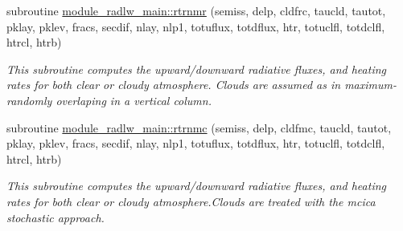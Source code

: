 \textbf{ }\par
\begin{DoxyCompactItemize}
\item 
subroutine \hyperlink{group__module__radlw__main_ga8d4a6fecb4ad25468e91661a79d4ca20}{module\+\_\+radlw\+\_\+main\+::rtrnmr} (semiss, delp, cldfrc, taucld, tautot, pklay, pklev, fracs, secdif, nlay, nlp1, totuflux, totdflux, htr, totuclfl, totdclfl, htrcl, htrb)
\begin{DoxyCompactList}\small\item\em This subroutine computes the upward/downward radiative fluxes, and heating rates for both clear or cloudy atmosphere. Clouds are assumed as in maximum-\/randomly overlaping in a vertical column. \end{DoxyCompactList}\end{DoxyCompactItemize}

\textbf{ }\par
\begin{DoxyCompactItemize}
\item 
subroutine \hyperlink{group__module__radlw__main_ga1445abd529b76abe7ffb80e843d9fafc}{module\+\_\+radlw\+\_\+main\+::rtrnmc} (semiss, delp, cldfmc, taucld, tautot, pklay, pklev, fracs, secdif, nlay, nlp1, totuflux, totdflux, htr, totuclfl, totdclfl, htrcl, htrb)
\begin{DoxyCompactList}\small\item\em This subroutine computes the upward/downward radiative fluxes, and heating rates for both clear or cloudy atmosphere.\+Clouds are treated with the mcica stochastic approach. \end{DoxyCompactList}\end{DoxyCompactItemize}


